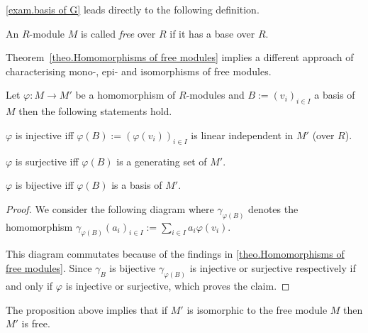 \cref{exam.basis of G} leads directly to the following definition.
\begin{defin}
An $R$-module $M$ is called \emph{free} over $R$ if it has a base over $R$.
\end{defin}

Theorem~\ref{theo.Homomorphisms of free modules} implies a different approach of characterising mono-, epi- and isomorphisms of free modules.
\begin{cor}
Let $\varphi\colon M\to M'$ be a homomorphism of $R$-modules and $B:=(v_i)_{i\in I}$ a basis of $M$ then the following statements hold.
\begin{exlist}
\item $\varphi$ is injective iff $\varphi(B):=(\varphi(v_i))_{i\in I}$ is linear independent in $M'$ (over $R$).
\item $\varphi$ is surjective iff $\varphi(B)$ is a generating set of $M'$.
\item $\varphi$ is bijective iff $\varphi(B)$ is a basis of $M'$.
\end{exlist}
\end{cor}
\begin{proof}
We consider the following diagram where $\gamma_{\varphi(B)}$ denotes the homomorphism $\gamma_{\varphi(B)}(a_i)_{i\in I}:=\sum_{i\in I}a_i\varphi(v_i)$.
\begin{center}
\end{center}
This diagram commutates because of the findings in \cref{theo.Homomorphisms of free modules}.
Since $\gamma_B$ is bijective $\gamma_{\varphi(B)}$ is injective or surjective respectively if and only if $\varphi$ is injective or surjective, which proves the claim.
\end{proof}
The proposition above implies that if $M'$ is isomorphic to the free module $M$ then $M'$ is free.


